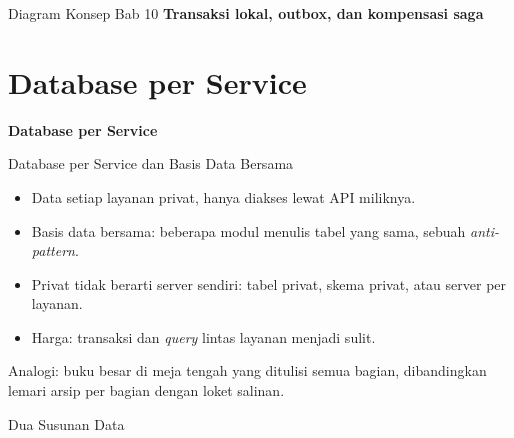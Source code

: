 \documentclass[aspectratio=169, table, 12pt]{beamer}
\begin{document}
\begin{frame}{{\Large Diagram Konsep Bab 10}}
  \centering
  {\small\bfseries Transaksi lokal, outbox, dan kompensasi saga}\par\medskip
\end{frame}

\section{Database per Service}

\begin{frame}{\hfill}
  \centering
  \Huge{\textbf{Database per Service}}
\end{frame}

\begin{frame}{{\Large Database per Service dan Basis Data Bersama}}
  \vspace{6pt}
  \small
  \begin{itemize}
    \item Data setiap layanan privat, hanya diakses lewat API miliknya.
    \item Basis data bersama: beberapa modul menulis tabel yang sama,
          sebuah \textit{anti-pattern}.
    \item Privat tidak berarti server sendiri: tabel privat, skema privat, atau
          server per layanan.
    \item Harga: transaksi dan \textit{query} lintas layanan menjadi sulit.
  \end{itemize}
  \vspace{6pt}
  {\small Analogi: buku besar di meja tengah yang ditulisi semua bagian,
  dibandingkan lemari arsip per bagian dengan loket salinan.}
\end{frame}

\begin{frame}{{\Large Dua Susunan Data}}
  \centering
\end{frame}
\end{document}
